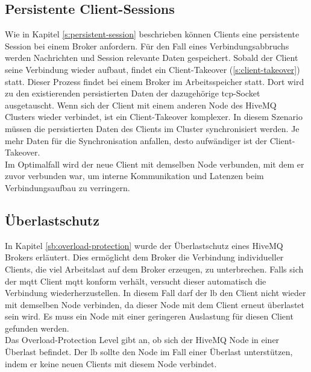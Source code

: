 \subsection{Persistente Client-Sessions} \label{sp:persistent-session}
Wie in Kapitel \ref{s:persistent-session} beschrieben können Clients eine persistente Session bei einem Broker anfordern.
Für den Fall eines Verbindungsabbruchs werden Nachrichten und Session relevante Daten gespeichert.
Sobald der Client seine Verbindung wieder aufbaut, findet ein Client-Takeover (\ref{s:client-takeover}) statt.
Dieser Prozess findet bei einem Broker im Arbeitsspeicher statt.
Dort wird zu den existierenden persistierten Daten der dazugehörige \ac{tcp}-Socket ausgetauscht.
Wenn sich der Client mit einem anderen Node des HiveMQ Clusters wieder verbindet, ist ein Client-Takeover komplexer.
In diesem Szenario müssen die persistierten Daten des Clients im Cluster synchronisiert werden.
Je mehr Daten für die Synchronisation anfallen, desto aufwändiger ist der Client-Takeover.
\\
Im Optimalfall wird der neue Client mit demselben Node verbunden, mit dem er zuvor verbunden war, um interne Kommunikation und Latenzen beim Verbindungsaufbau zu verringern.
\newpage

\subsection{Überlastschutz}
In Kapitel \ref{sb:overload-protection} wurde der Überlastschutz eines HiveMQ Brokers erläutert. Dies ermöglicht dem Broker die Verbindung individueller Clients, die viel Arbeitslast auf dem Broker erzeugen, zu unterbrechen. Falls sich der \ac{mqtt} Client \ac{mqtt} konform verhält, versucht dieser automatisch die Verbindung wiederherzustellen.
In diesem Fall darf der \acl{lb} den Client nicht wieder mit demselben Node verbinden, da dieser Node mit dem Client erneut überlastet sein wird. Es muss ein Node mit einer geringeren Auslastung für diesen Client gefunden werden.
\\
Das Overload-Protection Level gibt an, ob sich der HiveMQ Node in einer Überlast befindet.
Der \acl{lb} sollte den Node im Fall einer Überlast unterstützen, indem er keine neuen Clients mit diesem Node verbindet.

